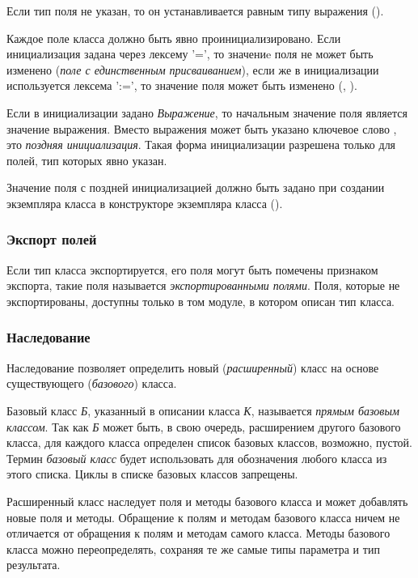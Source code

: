 Если тип поля не указан, то он устанавливается равным типу выражения ().

Каждое поле класса должно быть явно проинициализировано.
Если инициализация задана через лексему '=', то значениe поля не может быть изменено (\emph{поле с единственным присваиванием}), 
если же в инициализации используется лексема ':=', то значение поля может быть изменено  (, ).

Если в инициализации задано \emph{Выражение}, то начальным значение поля является значение выражения.
Вместо выражения может быть указано ключевое слово , это \emph{поздняя инициализация}. 
Такая форма инициализации разрешена только для полей, тип которых явно указан.

Значение поля с поздней инициализацией должно быть задано при создании экземпляра класса в конструкторе экземпляра класса (). 

\hypertarget{exported-fields}{%
\subsubsection{Экспорт полей}\label{decls:exported-fields}}

Если тип класса экспортируется, его поля могут быть помечены признаком экспорта, такие поля называется \emph{экспортированными полями}.
Поля, которые не экспортированы, доступны только в том модуле, в котором описан тип класса.

\hypertarget{inheritance}{%
\subsubsection{Наследование}\label{decls:inheritance}}

Наследование позволяет определить новый (\emph{расширенный}) класс  на основе существующего (\emph{базового}) класса. 

Базовый класс \emph{Б}, указанный в описании класса \emph{К}, называется \emph{прямым базовым классом}. 
Так как \emph{Б} может быть, в свою очередь, расширением другого базового класса, для каждого класса определен список базовых классов, возможно, пустой.
Термин \emph{базовый класс} будет использовать для обозначения любого класса из этого списка. Циклы в списке базовых классов запрещены.

Расширенный класс наследует поля и методы базового класса и может добавлять новые поля и методы.
Обращение к полям и методам базового класса ничем не отличается от обращения к полям и методам самого класса. 
Методы базового класса можно переопределять, сохраняя те же самые типы параметра и тип результата.

